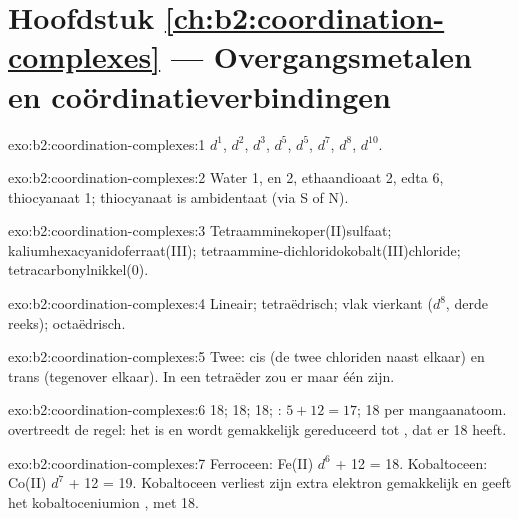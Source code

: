 \section*{Hoofdstuk \ref{ch:b2:coordination-complexes} --- Overgangsmetalen en coördinatieverbindingen}

\begin{solution}{exo:b2:coordination-complexes:1}
 $d^1$,  $d^2$,  $d^3$,  $d^5$,  $d^5$, 
$d^7$,  $d^8$,  $d^{10}$.
\end{solution}

\begin{solution}{exo:b2:coordination-complexes:2}
Water 1, en 2, ethaandioaat 2, edta 6, thiocyanaat 1; thiocyanaat is ambidentaat
(via S of N).
\end{solution}

\begin{solution}{exo:b2:coordination-complexes:3}
Tetraamminekoper(II)sulfaat; kalium\-hexa\-cyanido\-ferraat(III);
tetraammine-dichlorido\-kobalt(III)\-chloride; tetracarbonylnikkel(0).
\end{solution}

\begin{solution}{exo:b2:coordination-complexes:4}
Lineair; tetraëdrisch; vlak vierkant ($d^8$, derde reeks); octaëdrisch.
\end{solution}

\begin{solution}{exo:b2:coordination-complexes:5}
Twee: cis (de twee chloriden naast elkaar) en trans (tegenover elkaar). In een tetraëder zou
er maar één zijn.
\end{solution}

\begin{solution}{exo:b2:coordination-complexes:6}
 18;  18;  18; : $5 + 12 = 17$;
 18 per mangaanatoom.  overtreedt de regel: het is  en
wordt gemakkelijk gereduceerd tot \ce{[V(CO)6]-}, dat er 18 heeft.
\end{solution}

\begin{solution}{exo:b2:coordination-complexes:7}
Ferroceen: Fe(II) $d^6$ + 12 = 18. Kobaltoceen: Co(II) $d^7$ + 12 = 19. Kobaltoceen verliest
zijn extra elektron gemakkelijk en geeft het kobaltoceniumion \ce{[Co(C5H5)2]+}, met 18.
\end{solution}

